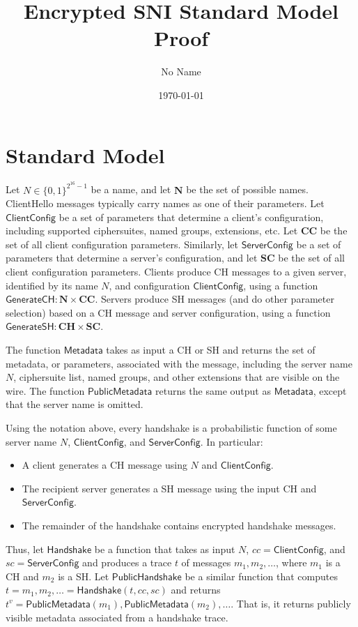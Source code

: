\documentclass{article}
\title{Encrypted SNI Standard Model Proof}
\author{No Name}
\date{\today}
\theoremstyle{definition}
\theoremstyle{definition}
\begin{document}
\maketitle

\section{Standard Model}

Let $N \in \{0,1\}^{2^{16} - 1}$ be a name, and let $\mathbf{N}$ be the set of possible 
names. ClientHello messages typically carry names as one of their parameters.
Let $\mathsf{ClientConfig}$ be a set of parameters that determine a client's configuration,
including supported ciphersuites, named groups, extensions, etc. 
Let $\mathbf{CC}$ be the set of all client configuration parameters.
Similarly, let $\mathsf{ServerConfig}$ be a set of parameters that determine a server's configuration,
and let $\mathbf{SC}$ be the set of all client configuration parameters.
Clients produce CH messages to a given server, identified by its name $N$, and configuration
$\mathsf{ClientConfig}$, using a function $\mathsf{GenerateCH}: \mathbf{N} \times \mathbf{CC}$.
Servers produce SH messages (and do other parameter selection) based on a CH message and 
server configuration, using a function $\mathsf{GenerateSH}: \mathbf{CH} \times \mathbf{SC}$.

The function $\mathsf{Metadata}$ takes as input a CH or SH and returns the set of metadata,
or parameters, associated with the message, including the server name $N$, ciphersuite list,
named groups, and other extensions that are visible on the wire. The function
$\mathsf{PublicMetadata}$ returns the same output as $\mathsf{Metadata}$, except that
the server name is omitted.

Using the notation above, every handshake is a probabilistic function of some server name $N$,
$\mathsf{ClientConfig}$, and $\mathsf{ServerConfig}$. In particular:
%
\begin{itemize}
    \item A client generates a CH message using $N$ and $\mathsf{ClientConfig}$.
    \item The recipient server generates a SH message using the input CH and $\mathsf{ServerConfig}$.
    \item The remainder of the handshake contains encrypted handshake messages.
\end{itemize}
%
Thus, let $\mathsf{Handshake}$ be a function that takes as input $N$,
$cc = \mathsf{ClientConfig}$, and $sc = \mathsf{ServerConfig}$ and produces 
a trace $t$ of messages $m_1, m_2, \dots$, where $m_1$ is a CH and $m_2$ is a SH.
Let $\mathsf{PublicHandshake}$ be a similar function that computes 
$t = m_1, m_2, \dots = \mathsf{Handshake}(t, cc, sc)$ 
and returns $t^v = \mathsf{PublicMetadata}(m_1), \mathsf{PublicMetadata}(m_2), \dots$. 
That is, it returns publicly visible metadata associated from a handshake trace. 
\end{document}
